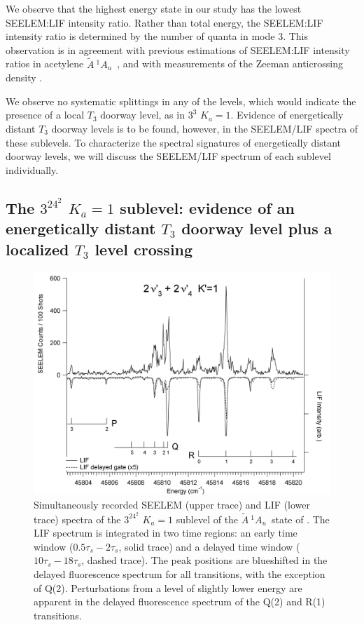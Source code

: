 \documentclass[12pt]{mitthesis}
\newcommand{\astate}{$
  \tilde{A} \: ^1\!A_u
  $}
\newcommand{\Ka}[1]{$K_a\!\!=\!#1$}
\begin{document}
We observe that the highest energy state in our study has the lowest
SEELEM:LIF intensity ratio.  Rather than total energy, the SEELEM:LIF
intensity ratio is determined by the number of quanta in mode 3.  This
observation is in agreement with previous estimations of SEELEM:LIF
intensity ratios in acetylene \astate\ \cite{humphrey97}, and with
measurements of the Zeeman anticrossing density \cite{dupre91}.

We observe no systematic splittings in any of the levels, which would
indicate the presence of a local $T_3$ doorway level, as in $3^3$
\Ka{1}.  Evidence of energetically distant $T_3$ doorway levels
is to be found, however, in the SEELEM/LIF spectra of these sublevels.
To characterize the spectral signatures of energetically distant
doorway levels, we will discuss the SEELEM/LIF spectrum of each
sublevel individually.


\subsection{The $3^24^2$ \Ka{1} sublevel: evidence of an
  energetically distant $T_3$ doorway level plus a localized $T_3$
  level crossing}




\begin{figure}
  \caption{Simultaneously recorded SEELEM (upper trace) and LIF (lower
    trace) spectra of the $3^24^2$ \Ka{1} sublevel of the \astate\
    state of .  The LIF spectrum is integrated in two time
    regions: an early time window ($0.5\tau_s-2\tau_s$, solid trace)
    and a delayed time window ($10\tau_s-18\tau_s$, dashed trace).
    The peak positions are blueshifted in the delayed fluorescence
    spectrum for all transitions, with the exception of Q(2).
    Perturbations from a level of slightly lower energy are apparent
    in the delayed fluorescence spectrum of the Q(2) and R(1)
    transitions.}
  \label{fig:spectrum-32b2}
  \centering
  \includegraphics[width=7in,angle=90]{acetylene-32b2-p3r4.png}
\end{figure}
\end{document}

